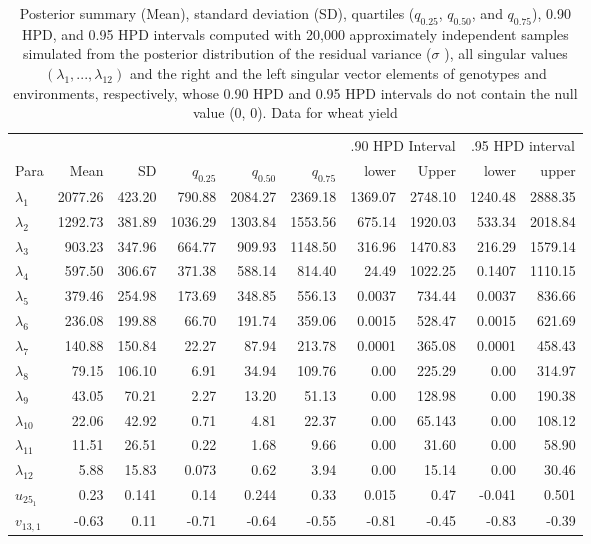 \begin{table}[h!]
	\centering
	\caption[HPD table for significant bilinear components]{Posterior summary (Mean), standard deviation (SD), quartiles ($q_{0.25}$, $q_{0.50}$, and $q_{0.75}$), 0.90 HPD, and 0.95 HPD intervals computed with 20,000 approximately independent samples simulated from the posterior distribution of the residual variance ($\sigma$ ), all singular values $(\lambda_1, . . . , \lambda_{12})$ and the right and
		the left singular vector elements of genotypes and environments, respectively, whose 0.90 HPD and
		0.95 HPD intervals do not contain the null value (0, 0). Data for wheat yield} 
\label{Table:4.6}
	\begin{tabular}{l r r r r r r r r r} 
		\toprule
		&&&&&& \multicolumn{2}{c}{.90 HPD Interval}  
		&\multicolumn{2}{c}{ .95 HPD interval}  \\
		\cmidrule(r){7-8}  \cmidrule(lr){9-10} 
		Para & Mean & SD & $q_{0.25}$ &$q_{0.50}$ & $q_{0.75}$ & lower & Upper & lower & upper\\
		\midrule
	
$\lambda_1$ & 2077.26& 423.20 & 790.88 & 2084.27 & 2369.18 & 1369.07 & 2748.10 & 1240.48 & 2888.35 \\
$\lambda_2$ & 1292.73& 381.89 & 1036.29& 1303.84 & 1553.56 & 675.14	 & 1920.03 & 533.34  & 2018.84\\
$\lambda_3$ & 903.23 & 347.96 & 664.77 & 909.93  & 1148.50 & 316.96  & 1470.83 & 216.29& 1579.14\\
$\lambda_4$	& 597.50 & 306.67 &	371.38 & 588.14  & 814.40  & 24.49   & 1022.25 & 0.1407  &	1110.15\\
$\lambda_5$	& 379.46 & 254.98 &	173.69 & 348.85  & 556.13  & 0.0037  & 734.44  & 0.0037  &	836.66\\
$\lambda_6$	& 236.08 & 199.88 &	66.70  & 191.74  & 359.06  & 0.0015  & 528.47  & 0.0015  &	621.69\\
$\lambda_7$ & 140.88 & 150.84 &	22.27  & 87.94   & 213.78  & 0.0001  &	365.08 & 0.0001  &	458.43\\
$\lambda_8$ & 79.15  & 106.10 &	6.91   & 34.94   & 109.76  & 0.00    &	225.29 & 0.00    &	314.97\\
$\lambda_9$ & 43.05  & 70.21  &	2.27   & 13.20   & 51.13   & 0.00    &	128.98 & 0.00    & 190.38\\
$\lambda_{10}$& 22.06& 42.92  &	0.71   & 4.81    & 22.37   & 0.00    &	65.143 &  0.00   &	108.12\\
$\lambda_{11}$& 11.51& 26.51  &	0.22   & 1.68    &	9.66   & 0.00    &	31.60  &  0.00   &	58.90 \\
$\lambda_{12}$&	5.88 & 15.83  &	0.073  & 0.62    &	3.94   & 0.00	 & 15.14   & 0.00	 & 30.46 \\
$u_{25_1}$	  & 0.23 & 0.141  & 0.14   & 0.244	 & 0.33	   & 0.015   &	0.47   & -0.041	 & 0.501 \\
$v_{13,1}$    &-0.63 & 0.11   &	-0.71  & -0.64   &-0.55    &-0.81    &	-0.45  & -0.83   &	-0.39 \\
		
		\bottomrule
	\end{tabular}
\end{table} 
